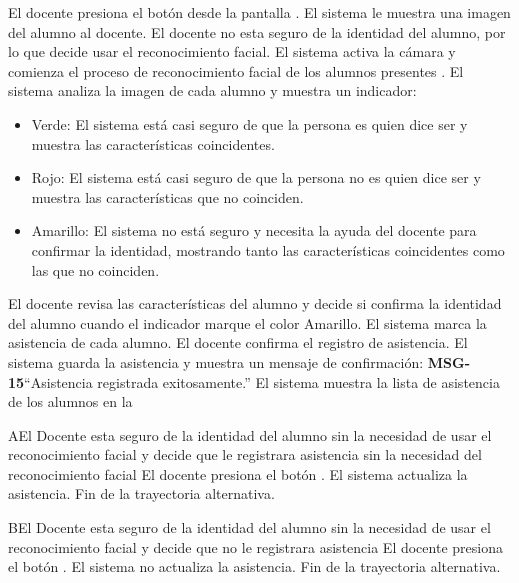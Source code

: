 \begin{UCtrayectoria}
	\UCpaso[\UCactor] El docente presiona el botón  desde la pantalla .
	\UCpaso El sistema le muestra una imagen del alumno al docente.
	\UCpaso[\UCactor] El docente no esta seguro de la identidad del alumno, por lo que decide usar el reconocimiento facial.  
	\UCpaso El sistema activa la cámara y comienza el proceso de reconocimiento facial de los alumnos presentes .  
	\UCpaso El sistema analiza la imagen de cada alumno y muestra un indicador:
	\begin{itemize}
		\item Verde: El sistema está casi seguro de que la persona es quien dice ser y muestra las características coincidentes.
		\item Rojo: El sistema está casi seguro de que la persona no es quien dice ser y muestra las características que no coinciden. 
		\item Amarillo: El sistema no está seguro y necesita la ayuda del docente para confirmar la identidad, mostrando tanto las características coincidentes como las que no coinciden. 
	\end{itemize}
	\UCpaso[\UCactor] El docente revisa las características del alumno y decide si confirma la identidad del alumno cuando el indicador marque el color Amarillo. 
	\UCpaso El sistema marca la asistencia de cada alumno.
	\UCpaso[\UCactor] El docente confirma el registro de asistencia.
	\UCpaso El sistema guarda la asistencia y muestra un mensaje de confirmación: {\bf MSG-15}{``Asistencia registrada exitosamente.''}
	\UCpaso El sistema muestra la lista de asistencia de los alumnos en la 
\end{UCtrayectoria}
\begin{UCtrayectoriaA}{A}{El Docente esta seguro de la identidad del alumno sin la necesidad de usar el reconocimiento facial y decide que le registrara asistencia sin la necesidad del reconocimiento facial}
	\UCpaso[\UCactor] El docente presiona el botón .
	\UCpaso El sistema actualiza la asistencia.
	\UCpaso Fin de la trayectoria alternativa.
\end{UCtrayectoriaA}
\begin{UCtrayectoriaA}{B}{El Docente esta seguro de la identidad del alumno sin la necesidad de usar el reconocimiento facial y decide que no le registrara asistencia}
	\UCpaso[\UCactor] El docente presiona el botón .
	\UCpaso El sistema no actualiza la asistencia.
	\UCpaso Fin de la trayectoria alternativa.
\end{UCtrayectoriaA}        
